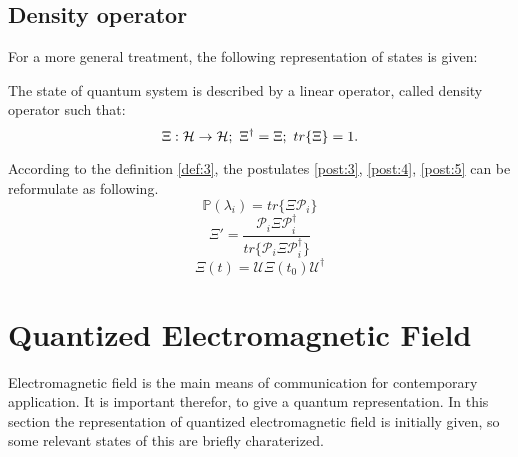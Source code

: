         \subsection{Density operator}
            For a more general treatment, the following representation of states is given:
            \begin{definition}
                The state of quantum system is described by a linear operator, called density
                operator such that:
                \begin{equation*}
                    \Xi:\Hilbert\to\Hilbert;\ \Xi^\dagger=\Xi;\ tr\{\Xi\}=1.
                \end{equation*}
                \label{def:3}
            \end{definition}
            According to the definition \ref{def:3}, the postulates \ref{post:3}, \ref{post:4},
            \ref{post:5} can be reformulate as following.
            \begin{equation}
                \mathbb{P}(\lambda_i)=tr\{\Xi\mathcal{P}_i\}
                \label{post:3.1}
            \end{equation}
            \begin{equation}
                \Xi'=\frac{\mathcal{P}_i\Xi\mathcal{P}_i^\dagger}
                {tr\{\mathcal{P}_i\Xi\mathcal{P}_i^\dagger\}}
                \label{post:4.1}
            \end{equation}
            \begin{equation}
                \Xi(t)=\mathcal{U}\Xi(t_0)\mathcal{U}^\dagger
                \label{post:5.1}
            \end{equation}

    \section{Quantized Electromagnetic Field}
        Electromagnetic field is the main means of communication for contemporary
        application. It is important therefor, to give a quantum representation.
        In this section the representation of quantized electromagnetic field is 
        initially given, so some relevant states of this are briefly charaterized.
                
